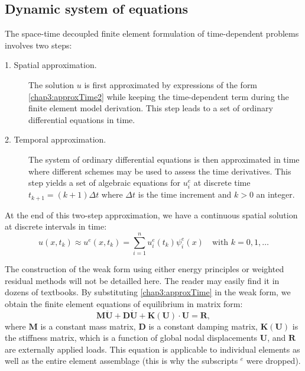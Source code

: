 	\subsection{Dynamic system of equations}	 \label{chap3:dynamic}
The space-time decoupled finite element formulation of time-dependent problems involves two steps:
\begin{description}
\item[1. Spatial approximation.]
The solution $ u $ is first approximated by expressions of the form \eqref{chap3:approxTime2} while keeping the time-dependent term during the finite element model derivation. This step leads to a set of ordinary differential equations in time.
\item[2. Temporal approximation.]
The system of ordinary differential equations is then approximated in time where different schemes may be used to assess the time derivatives. This step yields a set of algebraic equations for $ u^e_i $ at discrete time $ t_{k+1} = (k+1) \Delta t$ where $ \Delta t $ is the time increment and $ k > 0$ an integer. 
\end{description}
At the end of this two-step approximation, we have a continuous spatial solution at discrete intervals in time:
\begin{equation}
\label{chap3:approxTime}
u(x, t_k) \approx u^e(x, t_k) = \sum_{i=1}^n u^e_i(t_k) \psi^e_i(x) \quad \text{with } k = 0, 1, \ldots
\end{equation}
	
The construction of the weak form using either energy principles or weighted residual methods will not be detailled here. The reader may easily find it in dozens of textbooks. By substituting \eqref{chap3:approxTime} in the weak form, we obtain the finite element equations of equilibrium in matrix form:
\begin{equation}
\label{chap3:eqDynamic}
\mathbf{M} \mathbf{\ddot U} + \mathbf{D} \mathbf{ \dot U} + \mathbf{K}(\mathbf{U}) \cdot \mathbf{U} = \mathbf{R},
\end{equation}
where $ \mathbf{M} $ is a constant mass matrix, $\mathbf{D}$ is a constant damping matrix, $ \mathbf{K}(\mathbf{U}) $ is the stiffness matrix, which is a function of global nodal displacements $\mathbf{U}$, and $\mathbf{R}$ are externally applied loads. This equation is applicable to individual elements as well as the entire element assemblage (this is why the subscripts $ ^e $ were dropped).

